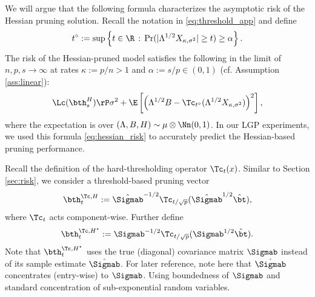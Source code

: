 We will argue that the following formula characterizes the asymptotic risk of the Hessian pruning solution. 
Recall the notation in \eqref{eq:threshold_app} and define
\begin{align}\label{eq:tdiam_app}
t^\diamond:=\sup\left\{t\in\R\,:\, \Pr(|\Lambda^{1/2}X_{\kappa,\sigma^2}|\geq t) \geq \alpha \right\}.
\end{align}
The risk of the Hessian-pruned model satisfies the following in the limit of $n,p,s\rightarrow\infty$ at rates $\kappa:=p/n>1$ and $\alpha:=s/p\in(0,1)$ (cf. Assumption \ref{ass:linear}):
\begin{align}\label{eq:hessian_risk}
\Lc(\bth^H_s) \rP \sigma^2 + \E\left[ \left(\Lambda^{1/2}B-\Tc_{t^\diamond}(\Lambda^{1/2}X_{\kappa,\sigma^2})\right)^2 \right],
\end{align}
where the expectation is over $(\Lambda,B,H)\sim\mu\otimes\Nn(0,1)$. In our LGP experiments, we used this formula \eqref{eq:hessian_risk} to accurately predict the Hessian-based pruning performance. 

Recall the definition of the hard-thresholding operator $\Tc_t(x)$. Similar to Section \ref{sec:risk}, we consider a threshold-based pruning vector $$\bth^{\Tc,H}_{t} := \hat\Sigmab^{-1/2}\Tc_{t/\sqrt{p}}(\hat\Sigmab^{1/2}\hat\bt),$$ where $\Tc_t$ acts component-wise. Further define 
$$\bth^{\Tc,H^\star}_{t} := \Sigmab^{-1/2}\Tc_{t/\sqrt{p}}(\Sigmab^{1/2}\hat\bt).$$
Note that $\bth^{\Tc,H^\star}_{t}$ uses the true (diagonal) covariance matrix $\Sigmab$ instead of its sample estimate $\hat\Sigmab$. For later reference, note here that $\hat\Sigmab$ concentrates (entry-wise) to $\Sigmab$. Using boundedness of $\Sigmab$ and standard concentration of sub-exponential random variables.


